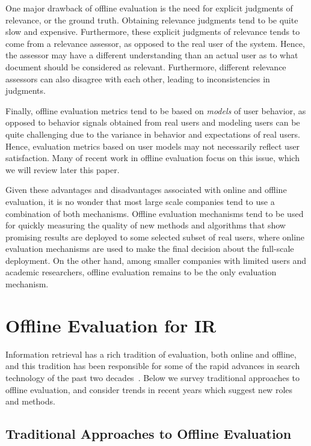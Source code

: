 One major drawback of offline evaluation is the need for explicit judgments of relevance, or the ground truth. Obtaining relevance judgments tend to be quite slow and expensive. Furthermore, these explicit judgments of relevance tends to come from a relevance assessor, as opposed to the real user of the system. Hence, the assessor may have a different understanding than an actual user as to what document should be considered as relevant. Furthermore, different relevance assessors can also disagree with each other, leading to inconsistencies in judgments. 

Finally, offline evaluation metrics tend to be based on \emph{models} of user behavior, as opposed to behavior signals obtained from real users and modeling users can be quite challenging due to the variance in behavior and expectations of real users. Hence, evaluation metrics based on user models may not necessarily reflect user satisfaction. Many of recent work in offline evaluation focus on this issue, which we will review later this paper.

Given these advantages and disadvantages associated with online and offline evaluation, it is no wonder that most large scale companies tend to use a combination of both mechanisms. Offline evaluation mechanisms tend to be used for quickly measuring the quality of new methods and  algorithms that show promising results are deployed to some selected subset of real users, where  online evaluation mechanisms are used to make the final decision about the full-scale deployment. On the other hand, among smaller companies with limited users and academic researchers, offline evaluation remains to be the only evaluation mechanism. 

\section{Offline Evaluation for IR}

Information retrieval has a rich tradition of evaluation, both online and offline, and this tradition has been responsible for some of the rapid advances in search technology of the past two decades~\citep{TRECimpact}. Below we survey traditional approaches to offline evaluation, and consider trends in recent years which suggest new roles and methods.

\subsection{Traditional Approaches to Offline Evaluation}

